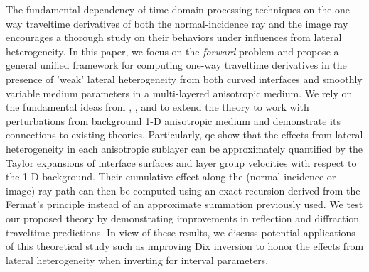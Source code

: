 
The fundamental dependency of time-domain processing techniques on the one-way traveltime derivatives of both the normal-incidence ray and the image ray encourages a thorough study on their behaviors under influences from lateral heterogeneity. In this paper, we focus on the \textit{forward} problem and propose a general unified framework for computing one-way traveltime derivatives in the presence of 'weak' lateral heterogeneity from both curved interfaces and smoothly variable medium parameters in a multi-layered anisotropic medium. We rely on the fundamental ideas from \cite{blias1981}, \cite{lynnclaerbout}, and \cite{bliasgrit1984} to extend the theory to work with perturbations from background 1-D anisotropic medium and demonstrate its connections to existing theories. Particularly, qe show that the effects from lateral heterogeneity in each anisotropic sublayer can be approximately quantified by the Taylor expansions of interface surfaces and layer group velocities with respect to the 1-D background. Their cumulative effect along the (normal-incidence or image) ray path can then be computed using an exact recursion derived from the Fermat's principle instead of an approximate summation previously used. We test our proposed theory by demonstrating improvements in reflection and diffraction traveltime predictions. In view of these results, we discuss potential applications of this theoretical study such as improving Dix inversion to honor the effects from lateral heterogeneity when inverting for interval parameters. 

